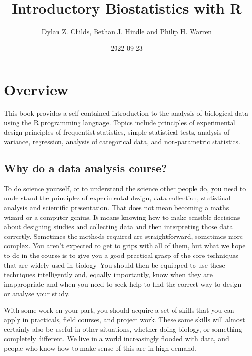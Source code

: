 \documentclass[
]{book}
\title{Introductory Biostatistics with R}
\author{Dylan Z. Childs, Bethan J. Hindle and Philip H. Warren}
\date{2022-09-23}
\begin{document}
\maketitle

{
\setcounter{tocdepth}{1}
\tableofcontents
}
\hypertarget{overview}{%
\chapter*{Overview}\label{overview}}

This book provides a self-contained introduction to the analysis of biological data using the R programming language. Topics include principles of experimental design principles of frequentist statistics, simple statistical tests, analysis of variance, regression, analysis of categorical data, and non-parametric statistics.

\hypertarget{why-do-a-data-analysis-course}{%
\section*{Why do a data analysis course?}\label{why-do-a-data-analysis-course}}

To do science yourself, or to understand the science other people do, you need to understand the principles of experimental design, data collection, statistical analysis and scientific presentation. That does not mean becoming a maths wizard or a computer genius. It means knowing how to make sensible decisions about designing studies and collecting data and then interpreting those data correctly. Sometimes the methods required are straightforward, sometimes more complex. You aren't expected to get to grips with all of them, but what we hope to do in the course is to give you a good practical grasp of the core techniques that are widely used in biology. You should then be equipped to use these techniques intelligently and, equally importantly, know when they are inappropriate and when you need to seek help to find the correct way to design or analyse your study.

With some work on your part, you should acquire a set of skills that you can apply in practicals, field courses, and project work. These same skills will almost certainly also be useful in other situations, whether doing biology, or something completely different. We live in a world increasingly flooded with data, and people who know how to make sense of this are in high demand.
\end{document}
